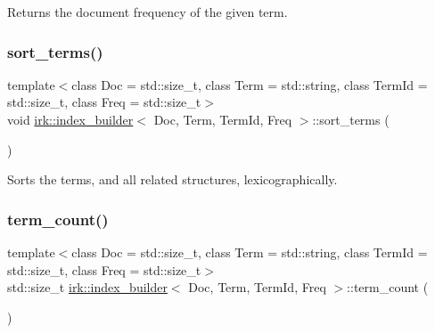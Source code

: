 Returns the document frequency of the given term. 

\mbox{\label{classirk_1_1index__builder_ad89b04727675b0fc56e91bbe9114e942}} 
\subsubsection{\texorpdfstring{sort\+\_\+terms()}{sort\_terms()}}
{\footnotesize\ttfamily template$<$class Doc  = std\+::size\+\_\+t, class Term  = std\+::string, class Term\+Id  = std\+::size\+\_\+t, class Freq  = std\+::size\+\_\+t$>$ \\
void \mbox{\hyperlink{classirk_1_1index__builder}{irk\+::index\+\_\+builder}}$<$ Doc, Term, Term\+Id, Freq $>$\+::sort\+\_\+terms (\begin{DoxyParamCaption}{ }\end{DoxyParamCaption})\hspace{0.3cm}{\ttfamily [inline]}}



Sorts the terms, and all related structures, lexicographically. 

\mbox{\label{classirk_1_1index__builder_a0ef10a3de8336e82fe5b03fc1b1ddd45}} 
\subsubsection{\texorpdfstring{term\+\_\+count()}{term\_count()}}
{\footnotesize\ttfamily template$<$class Doc  = std\+::size\+\_\+t, class Term  = std\+::string, class Term\+Id  = std\+::size\+\_\+t, class Freq  = std\+::size\+\_\+t$>$ \\
std\+::size\+\_\+t \mbox{\hyperlink{classirk_1_1index__builder}{irk\+::index\+\_\+builder}}$<$ Doc, Term, Term\+Id, Freq $>$\+::term\+\_\+count (\begin{DoxyParamCaption}{ }\end{DoxyParamCaption})\hspace{0.3cm}{\ttfamily [inline]}}



